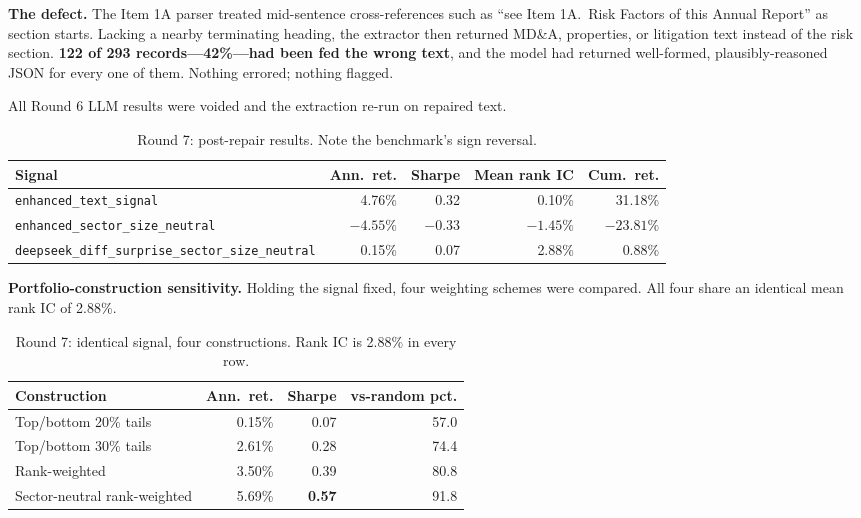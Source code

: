 \documentclass[11pt]{article}
\newcommand{\sig}[1]{\texttt{#1}}
\begin{document}
\textbf{The defect.} The Item 1A parser treated mid-sentence cross-references such as
``see Item 1A.\ Risk Factors of this Annual Report'' as section starts. Lacking a nearby
terminating heading, the extractor then returned MD\&A, properties, or litigation text
instead of the risk section. \textbf{122 of 293 records---42\%---had been fed the wrong
text}, and the model had returned well-formed, plausibly-reasoned JSON for every one of
them. Nothing errored; nothing flagged.

All Round 6 LLM results were voided and the extraction re-run on repaired text.

\begin{table}[H]
\centering\small
\caption{Round 7: post-repair results. Note the benchmark's sign reversal.}
\setlength{\tabcolsep}{5pt}\footnotesize
\begin{tabular}{l r r r r}
\toprule
\textbf{Signal} & \textbf{Ann.\ ret.} & \textbf{Sharpe} & \textbf{Mean rank IC} & \textbf{Cum.\ ret.} \\
\midrule
\sig{enhanced\_text\_signal}                          & 4.76\%    & 0.32 & 0.10\% & 31.18\% \\
\sig{enhanced\_sector\_size\_neutral}                 & $-4.55\%$ & $\mathbf{-0.33}$ & $-1.45\%$ & $-23.81\%$ \\
\sig{deepseek\_diff\_surprise\_sector\_size\_neutral} & 0.15\%    & 0.07 & 2.88\% & 0.88\% \\
\bottomrule
\end{tabular}
\end{table}

\textbf{Portfolio-construction sensitivity.} Holding the signal fixed, four weighting
schemes were compared. All four share an identical mean rank IC of 2.88\%.

\begin{table}[H]
\centering\small
\caption{Round 7: identical signal, four constructions. Rank IC is 2.88\% in every row.}
\begin{tabular}{l r r r}
\toprule
\textbf{Construction} & \textbf{Ann.\ ret.} & \textbf{Sharpe} & \textbf{vs-random pct.} \\
\midrule
Top/bottom 20\% tails          & 0.15\% & 0.07 & 57.0 \\
Top/bottom 30\% tails          & 2.61\% & 0.28 & 74.4 \\
Rank-weighted                  & 3.50\% & 0.39 & 80.8 \\
Sector-neutral rank-weighted   & 5.69\% & \textbf{0.57} & 91.8 \\
\bottomrule
\end{tabular}
\end{table}
\end{document}

